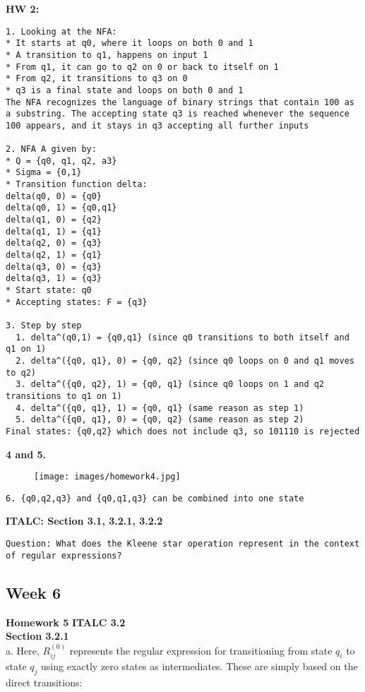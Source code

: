 \documentclass{article}
\theoremstyle{theorem}
\theoremstyle{definition}
\theoremstyle{remark}
\begin{document}
\textbf{HW 2:} 
\begin{lstlisting}
1. Looking at the NFA:
* It starts at q0, where it loops on both 0 and 1
* A transition to q1, happens on input 1
* From q1, it can go to q2 on 0 or back to itself on 1
* From q2, it transitions to q3 on 0
* q3 is a final state and loops on both 0 and 1
The NFA recognizes the language of binary strings that contain 100 as a substring. The accepting state q3 is reached whenever the sequence 100 appears, and it stays in q3 accepting all further inputs

2. NFA A given by:
* Q = {q0, q1, q2, a3}
* Sigma = {0,1}
* Transition function delta:
delta(q0, 0) = {q0}
delta(q0, 1) = {q0,q1}
delta(q1, 0) = {q2}
delta(q1, 1) = {q1}
delta(q2, 0) = {q3}
delta(q2, 1) = {q1}
delta(q3, 0) = {q3}
delta(q3, 1) = {q3}
* Start state: q0
* Accepting states: F = {q3}

3. Step by step
  1. delta^(q0,1) = {q0,q1} (since q0 transitions to both itself and q1 on 1)
  2. delta^({q0, q1}, 0) = {q0, q2} (since q0 loops on 0 and q1 moves to q2)
  3. delta^({q0, q2}, 1) = {q0, q1} (since q0 loops on 1 and q2 transitions to q1 on 1)
  4. delta^({q0, q1}, 1) = {q0, q1} (same reason as step 1)
  5. delta^({q0, q1}, 0) = {q0, q2} (same reason as step 2)
Final states: {q0,q2} which does not include q3, so 101110 is rejected
\end{lstlisting}
\textbf{4 and 5. }\\
\begin{figure}[htbp]
    \centering
    \texttt{[image: images/homework4.jpg]} 
    \caption{}
\end{figure}

\begin{lstlisting}
6. {q0,q2,q3} and {q0,q1,q3} can be combined into one state

\end{lstlisting}
 
\textbf{ITALC: Section 3.1, 3.2.1, 3.2.2}
\begin{lstlisting}
Question: What does the Kleene star operation represent in the context of regular expressions?
\end{lstlisting}

\subsection{Week 6}
\textbf{Homework 5}
\textbf{ITALC 3.2} \\
\textbf{Section 3.2.1} \\
a. Here, \( R_{ij}^{(0)} \) represents the regular expression for transitioning from state \( q_i \) to state \( q_j \) using exactly zero states as intermediates. These are simply based on the direct transitions:
\end{document}
